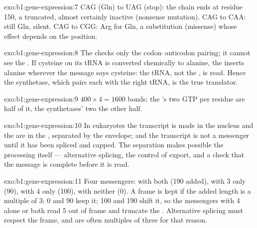 \begin{solution}{exo:b1:gene-expression:7}
CAG (Gln) to UAG (stop): the chain ends at residue 150, a truncated,
almost certainly inactive  (nonsense mutation). CAG to CAA:
still Gln, silent. CAG to CGG: Arg for Gln, a substitution
(missense) whose effect depends on the position.
\end{solution}

\begin{solution}{exo:b1:gene-expression:8}
The  checks only the codon--anticodon pairing; it cannot see
the . If cysteine on its tRNA is converted chemically to
alanine, the  inserts alanine wherever the message says
cysteine: the tRNA, not the , is read. Hence the synthetase,
which pairs each  with the right tRNA, is the true
translator.
\end{solution}

\begin{solution}{exo:b1:gene-expression:9}
$400\times 4 = 1600$ bonds; the 's two GTP per residue are
half of it, the synthetases' two the other half.
\end{solution}

\begin{solution}{exo:b1:gene-expression:10}
In eukaryotes the transcript is made in the nucleus and the
 are in the , separated by the envelope; and the
transcript is not a messenger until it has been spliced and capped.
The separation makes possible the processing itself --- alternative
splicing, the control of export, and a check that the message is
complete before it is read.
\end{solution}

\begin{solution}{exo:b1:gene-expression:11}
Four messengers: with both  (190  added), with 3 only
(90), with 4 only (100), with neither (0). A frame is kept if the
added length is a multiple of 3: 0 and 90 keep it; 100 and 190 shift
it, so the messengers with  4 alone or both  read  5
out of frame and truncate the . Alternative splicing must
respect the frame, and  are often multiples of three for that
reason.
\end{solution}


